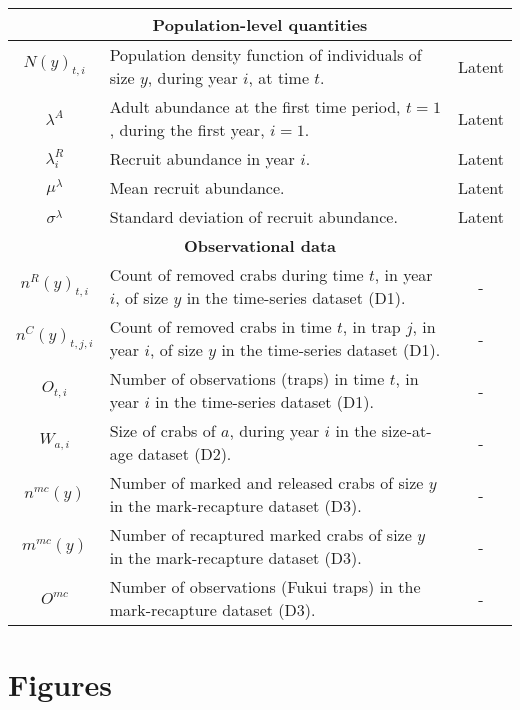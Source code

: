 \documentclass{article}
\begin{document}
\begin{longtable}{||c p{9cm} c||}
 \hline\hline
 \multicolumn{3}{||c||}{\textbf{Population-level quantities}} \\ 
 \hline
 $N(y)_{t,i}$ & Population density function of individuals of size $y$, during year $i$, at time $t$. & Latent \\ 
 \hline
 $\lambda^A$ & Adult abundance at the first time period, $t=1$, during the first year, $i=1$. & Latent \\
 \hline
 $\lambda^R_i$ & Recruit abundance in year $i$. & Latent \\
 \hline
 $\mu^{\lambda}$ & Mean recruit abundance. & Latent \\
 \hline
 $\sigma^{\lambda}$ & Standard deviation of recruit abundance. & Latent \\
 \hline\hline
 \multicolumn{3}{||c||}{\textbf{Observational data}} \\ 
 \hline
 $n^R(y)_{t,i}$ & Count of removed crabs during time $t$, in year $i$, of size $y$ in the time-series dataset (D1). & - \\ 
 \hline
 $n^C(y)_{t,j,i}$ & Count of removed crabs in time $t$, in trap $j$, in year $i$, of size $y$ in the time-series dataset (D1). & - \\
 \hline
 $O_{t,i}$ & Number of observations (traps) in time $t$, in year $i$ in the time-series dataset (D1). & - \\
 \hline
 $W_{a,i}$ & Size of crabs of $a$, during year $i$ in the size-at-age dataset (D2). & - \\
 \hline
 $n^{mc}(y)$ & Number of marked and released crabs of size $y$ in the mark-recapture dataset (D3). & - \\
 \hline
 $m^{mc}(y)$ & Number of recaptured marked crabs of size $y$ in the mark-recapture dataset (D3). & - \\
 \hline
 $O^{mc}$ & Number of observations (Fukui traps) in the mark-recapture dataset (D3). & - \\
 \hline
\end{longtable}

\section{Figures}
\end{document}
